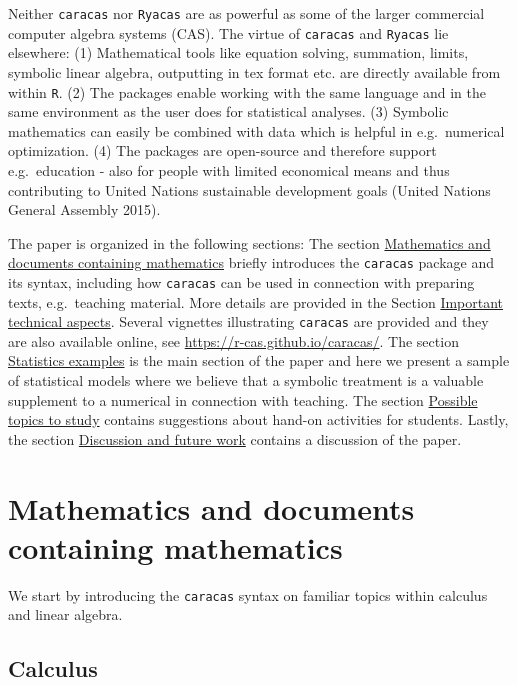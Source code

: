 Neither \texttt{caracas} nor \texttt{Ryacas} are as powerful as some
of the larger commercial computer algebra systems (CAS). The virtue of
\texttt{caracas} and \texttt{Ryacas} lie elsewhere:
(1) Mathematical tools like equation solving, summation, limits, symbolic linear
algebra, outputting in tex format etc. are directly available from
within \texttt{R}.
(2) The packages enable working with the same language and in the same
environment as the user does for statistical analyses.
(3) Symbolic mathematics can easily be combined with data which is
helpful in e.g.~numerical optimization.
(4) The packages are open-source and therefore support e.g.~education - also for people
with limited economical means and thus contributing to United
Nations sustainable development goals (United Nations General Assembly 2015).

The paper is organized in the following sections:
The section \protect\hyperlink{mathematics-and-documents-containing-mathematics}{Mathematics and documents containing mathematics} briefly introduces the \texttt{caracas} package
and its syntax, including
how \texttt{caracas} can be used in connection with preparing texts, e.g.~teaching
material.
More details are provided in the Section \protect\hyperlink{important-technical-aspects}{Important technical aspects}.
Several vignettes illustrating
\texttt{caracas} are provided and they are also available online, see
\url{https://r-cas.github.io/caracas/}.
The section \protect\hyperlink{statistics-examples}{Statistics examples} is the main section of the
paper and here we present a sample of statistical models where we
believe that a symbolic treatment is a valuable supplement to a
numerical in connection with teaching.
The section \protect\hyperlink{possible-topics-to-study}{Possible topics to study} contains suggestions about
hand-on activities for students.
Lastly,
the section \protect\hyperlink{discussion-and-future-work}{Discussion and future work} contains a discussion of the paper.

\hypertarget{mathematics-and-documents-containing-mathematics}{%
\section{Mathematics and documents containing mathematics}\label{mathematics-and-documents-containing-mathematics}}

We start by introducing the \texttt{caracas} syntax on familiar topics within calculus
and linear algebra.

\hypertarget{calculus}{%
\subsection{Calculus}\label{calculus}}

